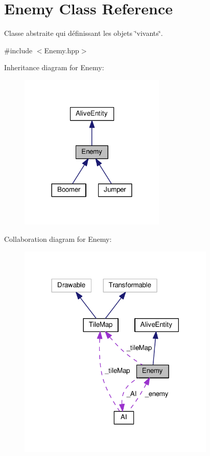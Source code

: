 \hypertarget{class_enemy}{\section{Enemy Class Reference}
\label{class_enemy}
}


Classe abstraite qui définissant les objets \char`\"{}vivants\char`\"{}.  




{\ttfamily \#include $<$Enemy.\+hpp$>$}



Inheritance diagram for Enemy\+:
\nopagebreak
\begin{figure}[H]
\begin{center}
\leavevmode
\includegraphics[width=197pt]{class_enemy__inherit__graph}
\end{center}
\end{figure}


Collaboration diagram for Enemy\+:
\nopagebreak
\begin{figure}[H]
\begin{center}
\leavevmode
\includegraphics[width=266pt]{class_enemy__coll__graph}
\end{center}
\end{figure}
